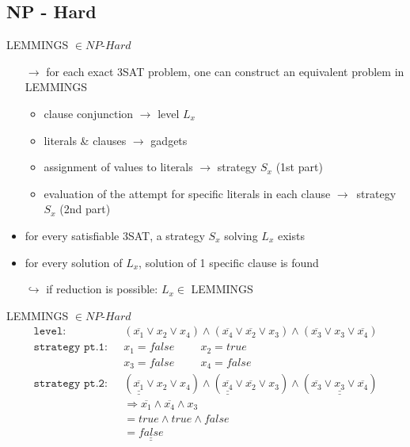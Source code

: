 \documentclass[]{beamer}
\begin{document}
\subsection{NP - Hard}
\begin{frame}{LEMMINGS $\in NP \text{-} Hard$}
\vspace{0.3cm}
\begin{itemize}
\item[$\rightarrow$] for each exact 3SAT problem, one can construct an equivalent problem in LEMMINGS
\begin{itemize}
\item clause conjunction $\rightarrow$ level $L_x$
\item literals \& clauses $\rightarrow$ gadgets
\item assignment of values to literals $\rightarrow$ strategy $S_{x}$ (1st part)
\item evaluation of the attempt for specific literals in each clause $\rightarrow$~strategy $S_{x}$ (2nd part)
\end{itemize}
\item for every satisfiable 3SAT, a strategy $S_x$ solving $L_x$ exists
\item for every solution of $L_x$, solution of 1 specific clause is found
\item[$\hookrightarrow$] if reduction is possible: $L_x \in$ LEMMINGS
\end{itemize}
\end{frame}

\begin{frame}{LEMMINGS $\in NP \text{-} Hard$}
\vspace{0.3cm}
\begin{align*}
\texttt{level:~~} &\left(\overline{x_1} \vee x_2 \vee x_4\right) \wedge\left(\overline{x_4}\vee \overline{x_2} \vee x_3\right) \wedge \left(\overline{x_3} \vee x_3 \vee \overline{x_4}\right)\\
\texttt{strategy pt.1:~~} &x_1 = false \hspace{1cm} x_2 = true\\ &x_3 = false \hspace{1cm} x_4 = false\\
\texttt{strategy pt.2:~~} &\left(\underline{\underline{\overline{x_1}}} \vee x_2 \vee x_4\right) \wedge\left(\underline{\underline{\overline{x_4}}}\vee \overline{x_2} \vee x_3\right) \wedge \left(\overline{x_3} \vee \underline{\underline{x_3}} \vee \overline{x_4}\right)\\
&\Rightarrow \overline{x_1} \wedge \overline{x_4} \wedge x_3
\\&= true \wedge true \wedge false
\\&= \underline{\underline{false}}
\end{align*}
\end{frame}
\end{document}
